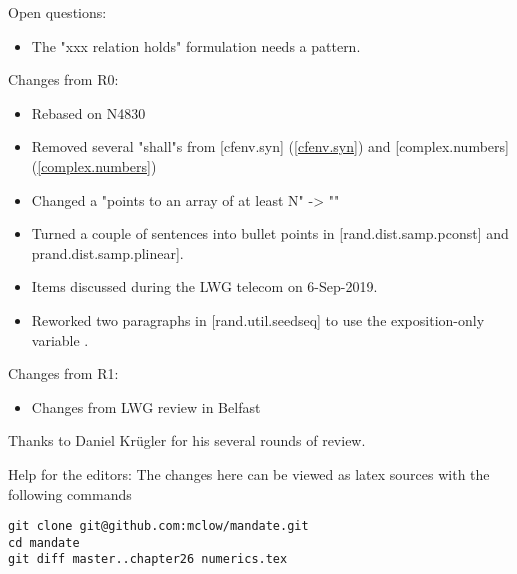 Open questions:
\begin{itemize}
\item{The "xxx relation holds" formulation needs a pattern.}
\end{itemize}


Changes from R0:
\begin{itemize}
\item{Rebased on N4830}
\item{Removed several "shall"s from [cfenv.syn] (\ref{cfenv.syn}) and [complex.numbers] (\ref{complex.numbers})}
\item{Changed a "points to an array of at least N" -> "\tcode{[p, p+n) is a valid range}"}
\item{Turned a couple of sentences into bullet points in [rand.dist.samp.pconst] and prand.dist.samp.plinear].}
\item{Items discussed during the LWG telecom on 6-Sep-2019.}
\item{Reworked two paragraphs in [rand.util.seedseq] to use the exposition-only variable .}
\end{itemize}

Changes from R1:
\begin{itemize}
\item{Changes from LWG review in Belfast}
\end{itemize}

Thanks to Daniel Krügler for his several rounds of review.

\vfill
Help for the editors: The changes here can be viewed as latex sources with the following commands
\begin{verbatim}
git clone git@github.com:mclow/mandate.git
cd mandate
git diff master..chapter26 numerics.tex
\end{verbatim}
